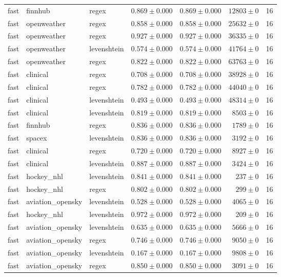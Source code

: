 \begin{table}[htbp]
\begin{tabular}{l l l r r r r}
fast & finnhub & regex & $0.869\pm0.000$ & $0.869\pm0.000$ & $12803\pm0$ & 16 \\
fast & openweather & regex & $0.858\pm0.000$ & $0.858\pm0.000$ & $25632\pm0$ & 16 \\
fast & openweather & regex & $0.927\pm0.000$ & $0.927\pm0.000$ & $36335\pm0$ & 16 \\
fast & openweather & levenshtein & $0.574\pm0.000$ & $0.574\pm0.000$ & $41764\pm0$ & 16 \\
fast & openweather & regex & $0.822\pm0.000$ & $0.822\pm0.000$ & $63763\pm0$ & 16 \\
fast & clinical & regex & $0.708\pm0.000$ & $0.708\pm0.000$ & $38928\pm0$ & 16 \\
fast & clinical & regex & $0.782\pm0.000$ & $0.782\pm0.000$ & $44040\pm0$ & 16 \\
fast & clinical & levenshtein & $0.493\pm0.000$ & $0.493\pm0.000$ & $48314\pm0$ & 16 \\
fast & clinical & levenshtein & $0.819\pm0.000$ & $0.819\pm0.000$ & $8503\pm0$ & 16 \\
fast & finnhub & regex & $0.836\pm0.000$ & $0.836\pm0.000$ & $1789\pm0$ & 16 \\
fast & spacex & levenshtein & $0.836\pm0.000$ & $0.836\pm0.000$ & $3192\pm0$ & 16 \\
fast & clinical & regex & $0.720\pm0.000$ & $0.720\pm0.000$ & $8927\pm0$ & 16 \\
fast & clinical & levenshtein & $0.887\pm0.000$ & $0.887\pm0.000$ & $3424\pm0$ & 16 \\
fast & hockey\_nhl & levenshtein & $0.841\pm0.000$ & $0.841\pm0.000$ & $237\pm0$ & 16 \\
fast & hockey\_nhl & regex & $0.802\pm0.000$ & $0.802\pm0.000$ & $299\pm0$ & 16 \\
fast & aviation\_opensky & levenshtein & $0.528\pm0.000$ & $0.528\pm0.000$ & $4065\pm0$ & 16 \\
fast & hockey\_nhl & levenshtein & $0.972\pm0.000$ & $0.972\pm0.000$ & $209\pm0$ & 16 \\
fast & aviation\_opensky & levenshtein & $0.635\pm0.000$ & $0.635\pm0.000$ & $5666\pm0$ & 16 \\
fast & aviation\_opensky & regex & $0.746\pm0.000$ & $0.746\pm0.000$ & $9050\pm0$ & 16 \\
fast & aviation\_opensky & levenshtein & $0.167\pm0.000$ & $0.167\pm0.000$ & $9808\pm0$ & 16 \\
fast & aviation\_opensky & regex & $0.850\pm0.000$ & $0.850\pm0.000$ & $3091\pm0$ & 16 \\

\end{tabular}
\end{table}
